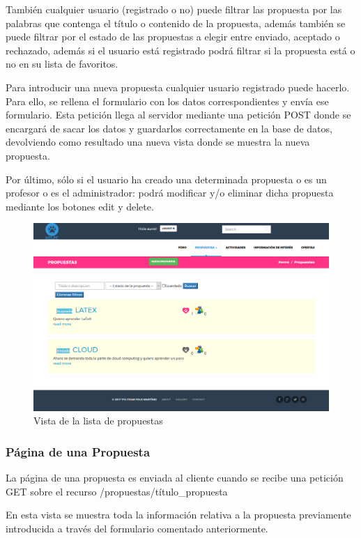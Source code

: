 También cualquier usuario (registrado o no) puede filtrar las propuesta por las palabras que contenga el título o contenido de la propuesta, además también se puede filtrar por el estado de las propuestas a elegir entre enviado, aceptado o rechazado, además si el usuario está registrado podrá filtrar si la propuesta está o no en su lista de favoritos.


Para introducir una nueva propuesta cualquier usuario registrado puede hacerlo. Para ello, se rellena el formulario con los datos correspondientes y envía ese formulario. Esta petición llega al servidor mediante una petición POST donde se encargará de sacar los datos y guardarlos correctamente en la base de datos, devolviendo como resultado una nueva vista donde se muestra la nueva propuesta.


Por último, sólo si el usuario ha creado una determinada propuesta o es un profesor o es el administrador: podrá modificar y/o eliminar dicha propuesta mediante los botones edit y delete.

\begin{figure}[H]
   \centering
   \includegraphics[width=12cm]{img/propuestas}
   \caption{Vista de la lista de propuestas}
   \label{figura:propuestas}
\end{figure}

\subsubsection{Página de una Propuesta}
\label{subsubsec:propuesta}


La página de una propuesta es enviada al cliente cuando se recibe una petición GET sobre el recurso /propuestas/{título\_propuesta}


En esta vista se muestra toda la información relativa a la propuesta previamente introducida a través del formulario comentado anteriormente. 



